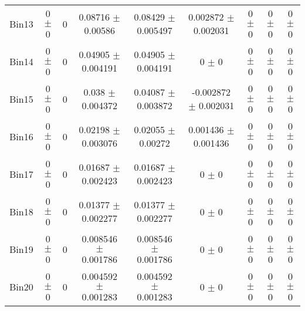 \begin{tabular}{@{\extracolsep{4pt}}lcccccccc@{}}
     Bin13 & 0 $\pm$ 0 & 0 & 0.08716 $\pm$ 0.00586 & 0.08429 $\pm$ 0.005497 & 0.002872 $\pm$ 0.002031 & 0 $\pm$ 0 & 0 $\pm$ 0 & 0 $\pm$ 0 \\ 
     Bin14 & 0 $\pm$ 0 & 0 & 0.04905 $\pm$ 0.004191 & 0.04905 $\pm$ 0.004191 & 0 $\pm$ 0 & 0 $\pm$ 0 & 0 $\pm$ 0 & 0 $\pm$ 0 \\ 
     Bin15 & 0 $\pm$ 0 & 0 & 0.038 $\pm$ 0.004372 & 0.04087 $\pm$ 0.003872 & -0.002872 $\pm$ 0.002031 & 0 $\pm$ 0 & 0 $\pm$ 0 & 0 $\pm$ 0 \\ 
     Bin16 & 0 $\pm$ 0 & 0 & 0.02198 $\pm$ 0.003076 & 0.02055 $\pm$ 0.00272 & 0.001436 $\pm$ 0.001436 & 0 $\pm$ 0 & 0 $\pm$ 0 & 0 $\pm$ 0 \\ 
     Bin17 & 0 $\pm$ 0 & 0 & 0.01687 $\pm$ 0.002423 & 0.01687 $\pm$ 0.002423 & 0 $\pm$ 0 & 0 $\pm$ 0 & 0 $\pm$ 0 & 0 $\pm$ 0 \\ 
     Bin18 & 0 $\pm$ 0 & 0 & 0.01377 $\pm$ 0.002277 & 0.01377 $\pm$ 0.002277 & 0 $\pm$ 0 & 0 $\pm$ 0 & 0 $\pm$ 0 & 0 $\pm$ 0 \\ 
     Bin19 & 0 $\pm$ 0 & 0 & 0.008546 $\pm$ 0.001786 & 0.008546 $\pm$ 0.001786 & 0 $\pm$ 0 & 0 $\pm$ 0 & 0 $\pm$ 0 & 0 $\pm$ 0 \\ 
     Bin20 & 0 $\pm$ 0 & 0 & 0.004592 $\pm$ 0.001283 & 0.004592 $\pm$ 0.001283 & 0 $\pm$ 0 & 0 $\pm$ 0 & 0 $\pm$ 0 & 0 $\pm$ 0 \\ 
\hline\hline
  \end{tabular}
